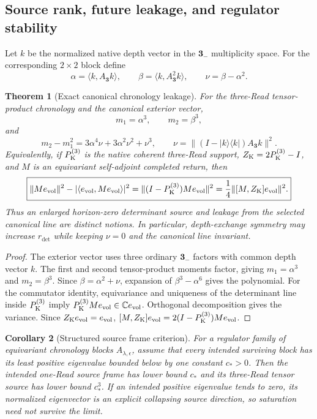 \documentclass[11pt]{article}
\newtheorem{theorem}{Theorem}[section]
\newtheorem{corollary}[theorem]{Corollary}
\theoremstyle{definition}
\theoremstyle{remark}
\newcommand{\C}{\mathbb C}
\begin{document}
\subsection{Source rank, future leakage, and regulator stability}

Let $k$ be the normalized native depth vector in the $\mathbf3_-$ multiplicity
space.  For the corresponding $2\times2$ block define
\[
 \alpha=\langle k,A_{\mathbf3}k\rangle,
 \qquad
 \beta=\langle k,A_{\mathbf3}^2k\rangle,
 \qquad
 \nu=\beta-\alpha^2.
\]

\begin{theorem}[Exact canonical chronology leakage]
\label{thm:canonical-chronology-leakage-master}
For the three-Read tensor-product chronology and the canonical exterior vector,
\[
 \boxed{m_1=\alpha^3,\qquad m_2=\beta^3,}
\]
and
\[
 \boxed{
 m_2-m_1^2
 =3\alpha^4\nu+3\alpha^2\nu^2+\nu^3,\qquad
 \nu=\|(I-|k\rangle\langle k|)A_{\mathbf3}k\|^2.}
\]
Equivalently, if $P_{\rm K}^{(3)}$ is the native coherent three-Read support,
$Z_{\rm K}=2P_{\rm K}^{(3)}-I$, and $M$ is an equivariant self-adjoint completed
return, then
\[
 \boxed{
 \|Me_{\rm vol}\|^2-|\langle e_{\rm vol},Me_{\rm vol}\rangle|^2
 =\|(I-P_{\rm K}^{(3)})Me_{\rm vol}\|^2
 =\frac14\|[M,Z_{\rm K}]e_{\rm vol}\|^2.}
\]
Thus an enlarged horizon-zero determinant source and leakage from the selected
canonical line are distinct notions.  In particular, depth-exchange symmetry
may increase $r_{\det}$ while keeping $\nu=0$ and the canonical line invariant.
\end{theorem}

\begin{proof}
The exterior vector uses three ordinary $\mathbf3_-$ factors with common depth
vector $k$.  The first and second tensor-product moments factor, giving
$m_1=\alpha^3$ and $m_2=\beta^3$.  Since
$\beta=\alpha^2+\nu$, expansion of $\beta^3-\alpha^6$ gives the polynomial.
For the commutator identity, equivariance and uniqueness of the determinant
line inside $P_{\rm K}^{(3)}$ imply
$P_{\rm K}^{(3)}Me_{\rm vol}\in\C e_{\rm vol}$.  Orthogonal decomposition gives
the variance.  Since $Z_{\rm K}e_{\rm vol}=e_{\rm vol}$,
$[M,Z_{\rm K}]e_{\rm vol}=2(I-P_{\rm K}^{(3)})Me_{\rm vol}$.
\end{proof}

\begin{corollary}[Structured source frame criterion]
\label{cor:structured-frame-master}
For a regulator family of equivariant chronology blocks $A_{\lambda,\epsilon}$,
assume that every intended surviving block has its least positive eigenvalue
bounded below by one constant $c_*>0$.  Then the intended one-Read source frame
has lower bound $c_*$ and its three-Read tensor source has lower bound $c_*^3$.
If an intended positive eigenvalue tends to zero, its normalized eigenvector is
an explicit collapsing source direction, so saturation need not survive the
limit.
\end{corollary}
\end{document}
